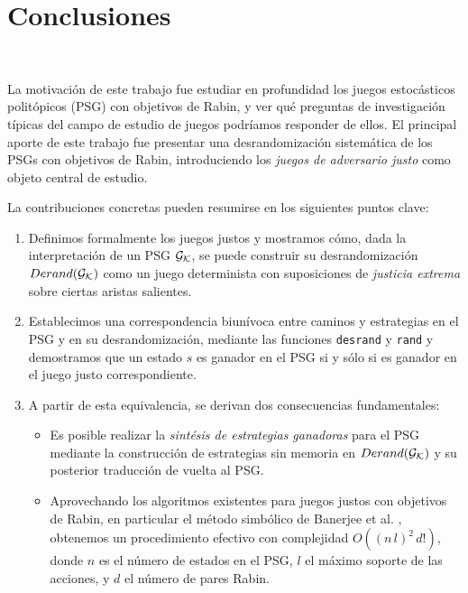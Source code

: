 \chapter{Conclusiones}
~\label{cap:conclusions}
\vspace{-1cm}

La motivación de este trabajo fue estudiar en profundidad los juegos
estocásticos politópicos (PSG) con objetivos de Rabin, y ver qué preguntas de
investigación típicas del campo de estudio de juegos podríamos responder de
ellos. El principal aporte de este trabajo fue presentar una desrandomización
sistemática de los PSGs con objetivos de Rabin, introduciendo los \emph{juegos
	de adversario justo} como objeto central de estudio.

La contribuciones concretas pueden resumirse en los siguientes puntos clave:

\begin{enumerate}
	\item Definimos formalmente los juegos justos y mostramos cómo, dada la
	      interpretación de un PSG $\mathcal{G}_{\mathcal{K}}$, se puede construir su desrandomización $Derand(\mathcal{G}_{\mathcal{K}})$
	      como un juego determinista con suposiciones de \emph{justicia extrema} sobre
	      ciertas aristas salientes.
	\item Establecimos una correspondencia biunívoca entre caminos y estrategias en el
	      PSG y en su desrandomización, mediante las funciones \texttt{desrand} y
	      \texttt{rand} y demostramos que un estado $s$ es ganador en el PSG si y sólo si
	      es ganador en el juego justo correspondiente.
	\item A partir de esta equivalencia, se derivan dos consecuencias fundamentales:
	      \begin{itemize}
		      \item Es posible realizar la \emph{sintésis de estrategias ganadoras} para el PSG
		            mediante la construcción de estrategias sin memoria en $Derand(\mathcal{G}_{\mathcal{K}})$ y su posterior
		            traducción de vuelta al PSG.
		      \item Aprovechando los algoritmos existentes para juegos justos con objetivos de
		            Rabin, en particular el método simbólico de Banerjee et al. \cite{Banerjee},
		            obtenemos un procedimiento efectivo con complejidad $O((n\,l)^2\,d!)$, donde
		            $n$ es el número de estados en el PSG, $l$ el máximo soporte de las acciones, y
		            $d$ el número de pares Rabin.
	      \end{itemize}
\end{enumerate}

